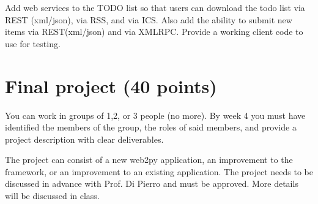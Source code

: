 \documentclass[12pt]{article}
\begin{document}
Add web services to the TODO list so that users can download the todo list via REST (xml/json), via RSS, and via ICS. Also add the ability to submit new items via REST(xml/json) and via XMLRPC. Provide a working client code to use for testing.

\section{Final project (40 points)}

You can work in groups of 1,2, or 3 people (no more). By week 4 you must have identified the members of the group, the roles of said members, and provide a project description with clear deliverables.

The project can consist of a new web2py application, an improvement to the framework, or an improvement to an existing application. The project needs to be discussed in advance with Prof. Di Pierro and must be approved. More details will be discussed in class.
\end{document}
